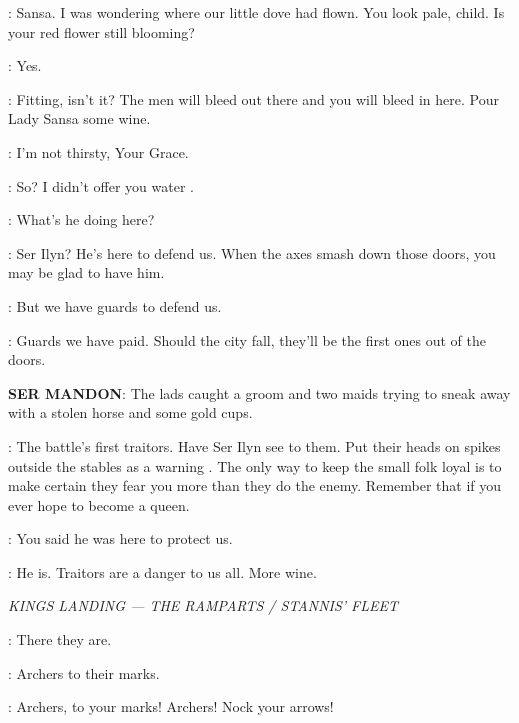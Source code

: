 \CERSEI: Sansa. 
I was wondering where our little dove had flown. 
You look pale, child. 
Is your red flower still blooming? 

\SANSA: Yes. 

\CERSEI: Fitting, isn't it? 
The men will bleed out there and you will bleed in here. 
 Pour Lady Sansa some wine. 


\SANSA: I'm not thirsty, Your Grace. 

\CERSEI: So? I didn't offer you water .

\SANSA:  What's he doing here? 

\CERSEI: Ser Ilyn? 
He's here to defend us. 
When the axes smash down those doors, you may be glad to have him. 

\SANSA: But we have guards to defend us. 

\CERSEI: Guards we have paid. 
Should the city fall, they'll be the first ones out of the doors. 


\textbf{SER MANDON}: The lads caught a groom and two maids trying to sneak away with a stolen horse and some gold cups. 

\CERSEI: The battle's first traitors. 
Have Ser Ilyn see to them.  Put their heads on spikes outside the
stables as a warning .
The only way to keep the small folk loyal is to make certain they fear
you more than they do the enemy.  Remember that if you ever hope to
become a queen.

\SANSA: You said he was here to protect us. 

\CERSEI: He is. 
Traitors are a danger to us all. 
More wine. 


\scene

\textit{KINGS LANDING --- THE RAMPARTS / STANNIS' FLEET} 


\JOFFREY: There they are. 

\TYRION: Archers to their marks. 

\SERGEANT: Archers, to your marks!  
Archers! 
Nock your arrows! 

